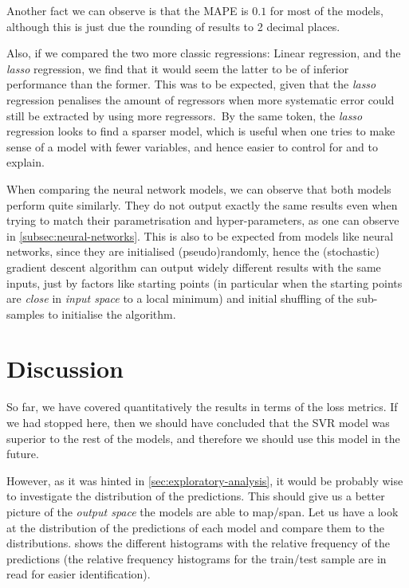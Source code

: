 \documentclass[11pt]{article}
\begin{document}
Another fact we can observe is that the MAPE is $0.1$ for most of the models, although this is just due the
rounding of results to 2 decimal places.

Also, if we compared the two more classic regressions: Linear regression, and the \emph{lasso} regression,
we find that it would seem the latter to be of inferior performance than the former.
This was to be expected, given that the \emph{lasso} regression penalises the amount of regressors when
more systematic error could still be extracted by using more regressors.\ By the same token, the \emph{lasso}
regression looks to find a sparser model, which is useful when one tries to make sense of a model with fewer
variables, and hence easier to control for and to explain.

When comparing the neural network models, we can observe that both models perform quite similarly.
They do not output exactly the same results even when trying to match their parametrisation and hyper-parameters,
as one can observe in \cref{subsec:neural-networks}.
This is also to be expected from models like neural networks, since they are initialised (pseudo)randomly, hence
the (stochastic) gradient descent algorithm can output widely different results with the same inputs, just by
factors like starting points (in particular when the starting points are \emph{close} in \emph{input space} to a
local minimum) and initial shuffling of the sub-samples to initialise the algorithm.




\section{Discussion}\label{sec:discussion}

So far, we have covered quantitatively the results in terms of the loss metrics.
If we had stopped here, then we should have concluded that the SVR model was superior to the rest of the models,
and therefore we should use this model in the future.

However, as it was hinted in \cref{sec:exploratory-analysis}, it would be probably wise to investigate the distribution
of the predictions.
This should give us a better picture of the \emph{output space} the models are able to map/span.
Let us have a look at the distribution of the predictions of each model and compare them to the
distributions.  shows the different histograms with the relative frequency of the
predictions (the relative frequency histograms for the train/test sample are in read for easier identification).
\end{document}
